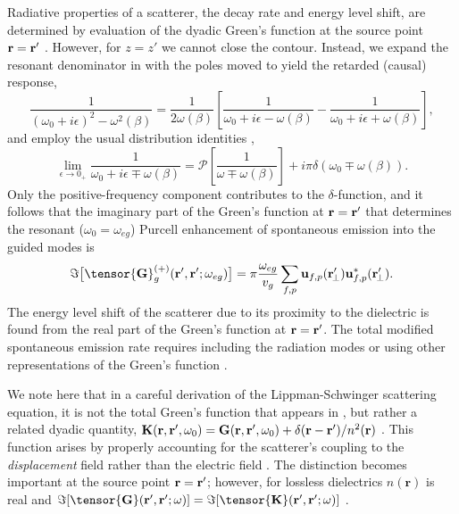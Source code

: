\documentclass[preprint,aps,pra,onecolumn]{revtex4-1} %
\begin{document}
Radiative properties of a scatterer, the decay rate and energy level shift, are determined by evaluation of the dyadic Green's function at the source point $\mathbf{r} = \mathbf{r}'$ \cite{fussell_decay_2005}.  However, for $z=z'$ we cannot close the contour. Instead, we expand the resonant denominator in  with the poles moved to yield the retarded (causal) response,
\begin{equation}
\frac{1}{(\omega_0+i\epsilon)^2-\omega^2(\beta)}=\frac{1}{2 \omega(\beta)}\left[ \frac{1}{\omega_0+ i 
\epsilon - \omega(\beta)} - \frac{1}{\omega_0+ i \epsilon + \omega(\beta)} \right],
\end{equation}
 and employ the usual distribution identities \cite{sondergaard_general_2001},
\begin{equation}
\lim_{\epsilon \rightarrow 0_+} \frac{1}{\omega_0 + i \epsilon \mp 
\omega(\beta)}=\mathcal{P}\left[\frac{1}{\omega \mp \omega(\beta)} \right] + i \pi \delta (\omega_0 \mp 
\omega(\beta)).
\end{equation}
Only the positive-frequency component contributes to the $\delta$-function, and it follows that the imaginary part of the Green's function at $\mathbf{r} = \mathbf{r}'$ that determines the resonant ($\omega_0 = \omega_{eg}$) Purcell enhancement of spontaneous emission into the guided modes is \cite{dung_spontaneous_2000, fussell_decay_2005, chen_finite-element_2010}
	\begin{equation}
		\Im \big[\tensor{\mathbf{G}}^{(+)}_g(\br',\br'; \omega_{eg}) \big] = \pi \frac{\omega_{eg}}{v_g } \sum_{f, p} 
		\mathbf{u}_{f, p} (\br_{\!\perp}^\prime)\mathbf{u}^*_{f , p} (\br_{\!\perp}^\prime).
	\end{equation}
The energy level shift of the scatterer due to its proximity to the dielectric is found from the real part of the Green's function at $\mathbf{r} = \mathbf{r}'$. The total modified spontaneous emission rate requires including the radiation modes \cite{le_kien_spontaneous_2005} or using other representations of the Green's function \cite{klimov_spontaneous_2004}.  

We note here that in a careful derivation of the Lippman-Schwinger scattering equation, it is not the total Green's function that appears in , but rather a related dyadic quantity, $\mathbf{K}(\mathbf{r},\mathbf{r}', \omega_0) = \mathbf{G}(\mathbf{r},\mathbf{r}', \omega_0) + \delta(\mathbf{r}-\mathbf{r}')/n^2(\mathbf{r})$ \cite{wubs_multiple-scattering_2004}. This function arises by properly accounting for the scatterer's coupling to the \emph{displacement} field rather than the electric field \cite{yao_ultrahigh_2009}.  The distinction becomes important at the source point $\mathbf{r} = \mathbf{r}'$; however, for lossless dielectrics $n(\mathbf{r})$ is real and $\Im[\tensor{\mathbf{G}}(\br',\br'; \omega)] = \Im[\tensor{\mathbf{K}}(\br',\br'; \omega)]$ \cite{yao_-chip_2010}. 
\end{document}
